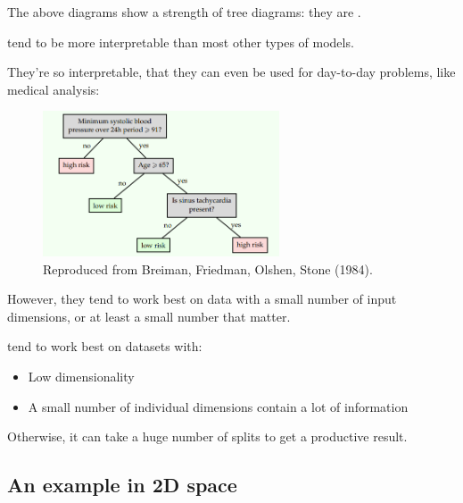     The above diagrams show a strength of tree diagrams: they are .\\

    \begin{concept}
         tend to be more interpretable than most other types of models.
    \end{concept}

    They're so interpretable, that they can even be used for day-to-day problems, like medical analysis:

    \begin{figure}[H]
        \centering
        \includegraphics[width=70mm,scale=0.5]{images/nonparametric_images/medical_tree.png}
        \caption*{Reproduced from Breiman, Friedman, Olshen, Stone (1984).}
    \end{figure}

    However, they tend to work best on data with a small number of input dimensions, or at least a small number that matter.\\

    \begin{concept}
         tend to work best on datasets with:

        \begin{itemize}
            \item Low dimensionality
            \item A small number of individual dimensions contain a lot of information
        \end{itemize}
    \end{concept}

    Otherwise, it can take a huge number of splits to get a productive result.





    


    \pagebreak

    \subsection{An example in 2D space}


